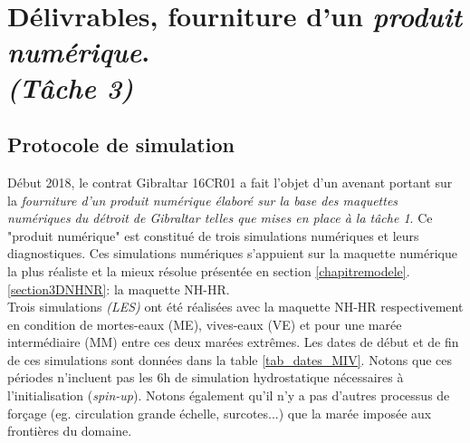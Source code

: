 \documentclass[a4paper,11pt]{report}
\begin{document}
\chapter{Délivrables, fourniture d'un \textit{produit numérique}.\\ \textit{(Tâche 3)}}

\label{chapitredelivrables}

\noindent{}

\section{Protocole de simulation}
Début 2018, le contrat Gibraltar 16CR01 a fait l'objet d'un avenant portant sur la \textit{fourniture d'un produit numérique élaboré sur la base des maquettes numériques du détroit de Gibraltar telles que mises en place à la tâche 1}. Ce "produit numérique" est constitué de trois simulations numériques et leurs diagnostiques. Ces simulations numériques s'appuient sur la maquette numérique la plus réaliste et la mieux résolue présentée en section \ref{chapitremodele}.\ref{section3DNHNR}: la maquette NH-HR.
\\

\noindent Trois simulations \textit{(LES)} ont été réalisées avec la maquette NH-HR respectivement en condition de mortes-eaux (ME), vives-eaux (VE) et pour une marée intermédiaire (MM) entre ces deux marées extrêmes. 
Les dates de début et de fin de ces simulations sont données dans la table \ref{tab_dates_MIV}. 
Notons que ces périodes n'incluent pas les 6h de simulation hydrostatique nécessaires à l'initialisation (\textit{spin-up}). 
Notons également qu'il n'y a pas d'autres processus de forçage (eg. circulation grande échelle, surcotes...) que la marée imposée aux frontières du domaine.
\end{document}
